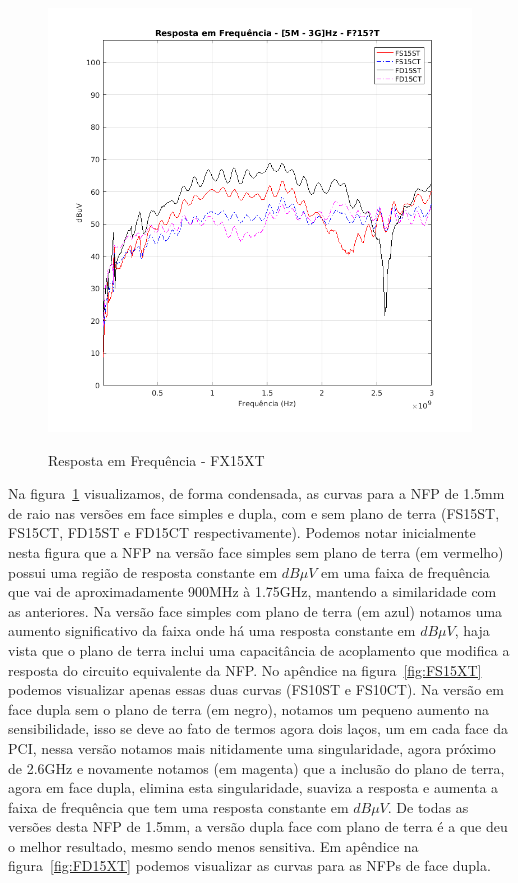 \begin{figure}[htb!]
	\centering 
	\caption{Resposta em Frequência - FX15XT}
	\includegraphics[scale=0.7]{./img/FX15XT}
	\label{fig:FX15XT}
\end{figure}

Na figura~\ref{fig:FX15XT} visualizamos, de forma condensada, as curvas para a NFP de 1.5mm de raio nas versões em face simples e dupla, com e sem plano de terra (FS15ST, FS15CT, FD15ST e FD15CT respectivamente). Podemos notar inicialmente nesta figura que a NFP na versão face simples sem plano de terra (em vermelho) possui uma região de resposta constante em $dB \mu V$ em uma faixa de frequência que vai de aproximadamente 900MHz à 1.75GHz, mantendo a similaridade com as anteriores. Na versão face simples com plano de terra (em azul) notamos uma aumento significativo da faixa onde há uma resposta constante em $dB \mu V$, haja vista que o plano de terra inclui uma capacitância de acoplamento que modifica a resposta do circuito equivalente da NFP. No apêndice na figura~\ref{fig:FS15XT} podemos visualizar apenas essas duas curvas (FS10ST e FS10CT). Na versão em face dupla sem o plano de terra (em negro), notamos um pequeno aumento na sensibilidade, isso se deve ao fato de termos agora dois laços, um em cada face da PCI, nessa versão notamos mais nitidamente uma singularidade, agora próximo de 2.6GHz e novamente notamos (em magenta) que a inclusão do plano de terra, agora em face dupla, elimina esta singularidade, suaviza a resposta e aumenta a faixa de frequência que tem uma resposta constante em $dB \mu V$. De todas as versões desta NFP de 1.5mm, a versão dupla face com plano de terra é a que deu o melhor resultado, mesmo sendo menos sensitiva. Em apêndice na figura~\ref{fig:FD15XT} podemos visualizar as curvas para as NFPs de face dupla.

